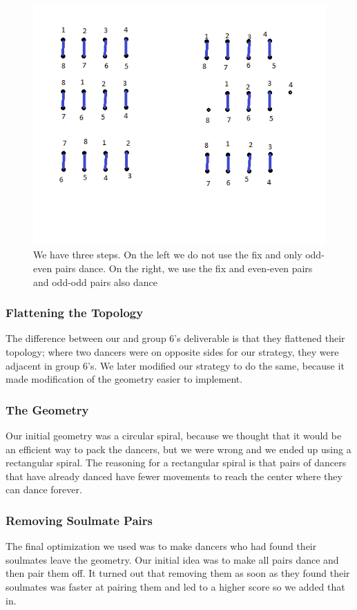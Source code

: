 \begin{figure}[h]
\center
\includegraphics[scale=0.5]{AllDancePairs.png}
\caption{We have three steps. On the left we do not use the fix and only odd-even pairs dance. On the right, we use the fix and even-even pairs and odd-odd pairs also dance}
\label{fig:All pairs dancing}
\end{figure}
\subsubsection{Flattening the Topology}
The difference between our and group 6's deliverable is that they flattened their topology; where two dancers were on opposite sides for our strategy, they were adjacent in group 6's. We later modified our strategy to do the same, because it made modification of the geometry easier to implement.\\
\subsubsection{The Geometry}
Our initial geometry was a circular spiral, because we thought that it would be an efficient way to pack the dancers, but we were wrong and we ended up using a rectangular spiral. The reasoning for a rectangular spiral is that pairs of dancers that have already danced have fewer movements to reach the center where they can dance forever.\\
\subsubsection{Removing Soulmate Pairs}
The final optimization we used was to make dancers who had found their soulmates leave the geometry. Our initial idea was to make all pairs dance and then pair them off. It turned out that removing them as soon as they found their soulmates was faster at pairing them and led to a higher score so we added that in.\\


